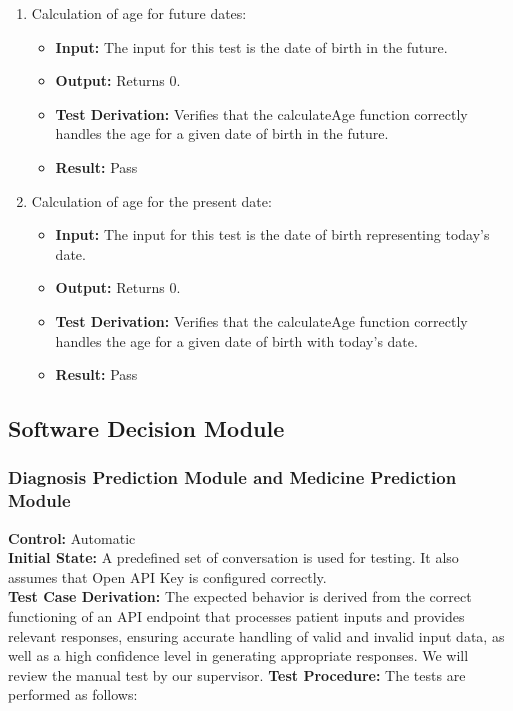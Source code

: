 \documentclass[12pt, titlepage]{article}
\begin{document}
\begin{enumerate}
    \item Calculation of age for future dates:
      \begin{itemize}
        \item \textbf{Input:} The input for this test is the date of birth in the future.    
        \item \textbf{Output:} Returns 0.
        \item \textbf{Test Derivation:} Verifies that the calculateAge function correctly handles the age for a given date of birth in the future.
        \item \textbf{Result:} Pass
      \end{itemize}

    \item Calculation of age for the present date:
      \begin{itemize}
        \item \textbf{Input:} The input for this test is the date of birth representing today's date.    
        \item \textbf{Output:} Returns 0.
        \item \textbf{Test Derivation:} Verifies that the calculateAge function correctly handles the age for a given date of birth with today's date.
        \item \textbf{Result:} Pass
      \end{itemize}
  \end{enumerate}

  \subsection{Software Decision Module}

  \subsubsection{Diagnosis Prediction Module and Medicine Prediction Module}

  \textbf{Control:} Automatic\\
  \textbf{Initial State:} A predefined set of conversation is used for testing. It also assumes that Open API Key is configured correctly.\\
  \textbf{Test Case Derivation:} The expected behavior is derived from the correct functioning of an API endpoint that processes patient inputs and provides relevant responses, ensuring accurate handling of valid and invalid input data, as well as a high confidence level in generating appropriate responses. We will review the manual test by our supervisor.
  \textbf{Test Procedure:} The tests are performed as follows:\\
\end{document}
